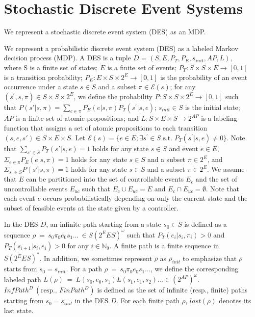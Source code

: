 \section{Stochastic Discrete Event Systems}
We represent a stochastic discrete event system (DES) as an MDP.

\begin{definition}
We represent a probabilistic discrete event system (DES) as a labeled Markov decision process (MDP). A DES is a tuple $D$ = $(S, E, P_T, P_E, s_{init}, AP, L)$, where S is a finite set of states; $E$ is a finite set of events; $P_T:S \times S \times E \rightarrow [0,1]$ is a transition probability; $P_E : E \times S \times 2^E \rightarrow [0,1]$ is the probability of an event occurrence under a state $s \in S$ and a subset $\pi \in \mathcal{E}(s)$; for any $(s^{\prime}, s, \pi) \in S \times S \times 2^E$, we define the probability $P : S \times S \times 2^{E} \rightarrow [0,1]$ such that $P(s'|s,\pi) = \sum_{e \in \pi}P_E(e|s,\pi) P_T(s^{\prime}|s,e)$; $s_{init} \in S$ is the initial state; $AP$ is a finite set of atomic propositions; and $L : S \times E \times S \rightarrow 2^{AP}$ is a labeling function that assigns a set of atomic propositions to each transition $(s, e, s') \in S \times E \times S$.
Let $\mathcal{E}(s) = \{ e \in E ; \exists s^{\prime} \in S \text{ s.t. } P_T (s^{\prime} | s, e) \neq 0 \}$.
Note that $\sum_{s' \in S} P_T(s'|s,e) = 1$ holds for any state $s \in S$ and event $e \in E$, $\Sigma_{e \in \pi} P_E(e|s,\pi) = 1$ holds for any state $s \in S$ and a subset $\pi \in 2^E$, and $\Sigma_{s^{\prime} \in S} P(s'|s,\pi) = 1$ holds for any state $s \in S$ and a subset $\pi \in 2^E$.
We assume that $E$ can be partitioned into the set of controllable events $E_c$ and the set of uncontrollable events $E_{uc}$ such that $E_c \cup E_{uc} = E$ and $E_c \cap E_{uc} = \emptyset$. Note that each event $e$ occurs probabilistically depending on only the current state and the subset of feasible events at the state given by a controller.

In the DES $D$, an infinite path starting from a state $s_0 \in S$ is defined as a sequence $\rho\ =\ s_0\pi_0e_0s_1 \ldots\ \in S (2^E E S)^{\omega}$ such that $P_T(e_{i}|s_i, \pi_i) > 0$ and $P_T(s_{i+1}|s_i, e_i) > 0$ for any $ i \in \mathbb{N}_0$. A finite path is a finite sequence in $S (2^E E S)^*$. In addition, we sometimes represent $\rho$ as $\rho_{init}$ to emphasize that $\rho$ starts from $s_0 = s_{init}$.
For a path $\rho\ =\ s_0\pi_0e_0s_1 \ldots$, we define the corresponding labeled path $L(\rho)\ =\ L(s_0,e_0,s_1)L(s_1,e_1,s_2) \ldots \in (2^{AP})^{\omega}$.
 $InfPath^{D}\ ( \text{resp., }FinPath^{D})$ is defined as the set of infinite (resp., finite) paths starting from $s_0=s_{init}$ in the DES $D$. For each finite path $\rho$, $last(\rho)$ denotes its last state.
\end{definition}

